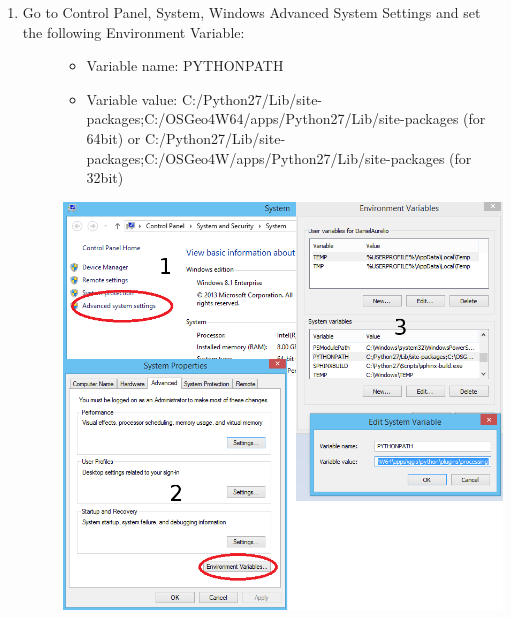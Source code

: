 \documentclass[letterpaper,10pt,english]{sphinxmanual}
\begin{document}
\begin{description}
\begin{enumerate}
\begin{description}
\begin{description}
\end{description}

\end{description}

\item {} \begin{description}
\item[{Go to Control Panel, System, Windows Advanced System Settings and set the following Environment Variable:}] \leavevmode\begin{itemize}
\item {} 
Variable name: PYTHONPATH

\item {} 
Variable value: C:/Python27/Lib/site-packages;C:/OSGeo4W64/apps/Python27/Lib/site-packages (for 64bit) or C:/Python27/Lib/site-packages;C:/OSGeo4W/apps/Python27/Lib/site-packages (for 32bit)

\end{itemize}

\includegraphics{set_variable.png}

\end{description}

\end{enumerate}

\end{description}
\end{document}
